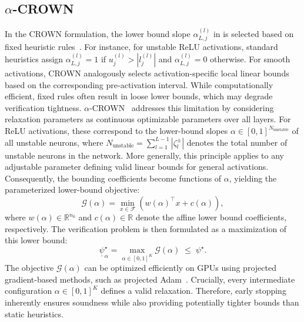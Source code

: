 \subsection{\texorpdfstring{$ \alpha $}{α}-CROWN}
\label{subsec:alpha-crown}
In the CROWN formulation, the lower bound slope $\alpha_{L,j}^{(l)}$ in  is selected based on fixed 
heuristic rules~\cite{zhangEfficientNeuralNetwork2018}. For instance, for unstable ReLU activations, standard heuristics assign 
$\alpha_{L,j}^{(l)} = 1$ if $u_j^{(l)} > |l_j^{(l)}|$ and $\alpha_{L,j}^{(l)} = 0$ otherwise. For smooth activations, 
CROWN analogously selects activation-specific local linear bounds based on the corresponding pre-activation interval.
While computationally efficient, fixed rules often result in loose lower bounds, which may degrade verification tightness.
$\alpha$-CROWN~\cite{xuFastCompleteEnabling2021} addresses this limitation by considering relaxation parameters as 
continuous optimizable parameters over all layers. For ReLU activations, these correspond to the lower-bound slopes
$\alpha \in [0, 1]^{N_{\mathrm{unstable}}}$ of all unstable neurons, where $N_{\mathrm{unstable}} = \sum_{l=1}^{L-1} |\zeta_l^\pm|$ denotes the total number of 
unstable neurons in the network. More generally, this principle applies to any adjustable parameter 
defining valid linear bounds for general activations.
Consequently, the bounding coefficients become functions of $\alpha$, yielding the parameterized lower-bound objective:
\begin{equation}
    \mathcal{G}(\alpha) = \min_{x \in \mathcal{F}} \left( w(\alpha)^\top x + c(\alpha) \right),
    \label{eq:alpha-crown-objective}
\end{equation}
where $w(\alpha) \in \mathbb{R}^{n_0}$ and $c(\alpha) \in \mathbb{R}$ denote the affine lower bound coefficients, respectively.
The verification problem is then formulated as a maximization of this lower bound:
\begin{equation}
    \label{eq:alpha-crown-opt}
    \underline{\psi}^\star_\alpha = \max_{\alpha \in [0, 1]^K} \mathcal{G}(\alpha) \;\le\; \psi^\star.
\end{equation}
The objective $\mathcal{G}(\alpha)$ can be optimized efficiently on GPUs using projected gradient-based methods, 
such as projected Adam~\cite{kingmaAdamMethodStochastic2015}. 
Crucially, every intermediate configuration $\alpha \in [0, 1]^K$ defines a valid relaxation. 
Therefore, early stopping inherently ensures soundness while also providing potentially tighter bounds 
than static heuristics. 